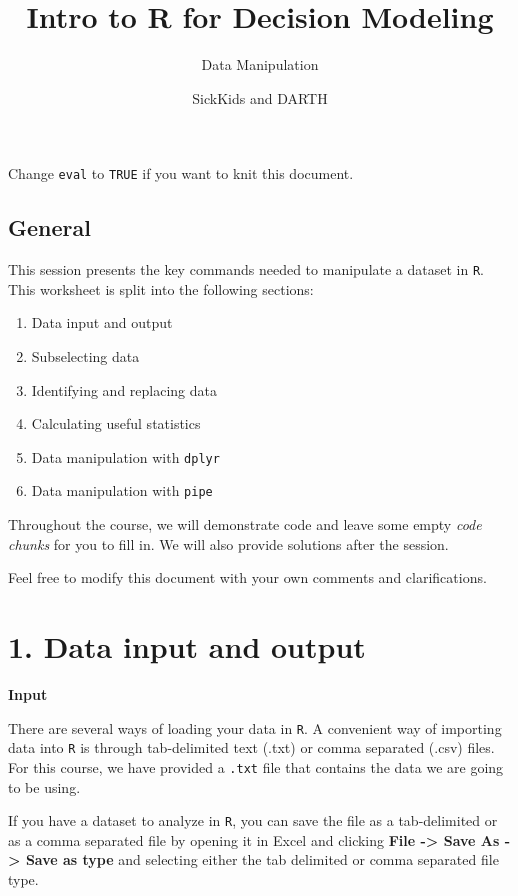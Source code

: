 \documentclass[
]{article}
\title{Intro to R for Decision Modeling}
\subtitle{Data Manipulation}
\author{SickKids and DARTH}
\date{}
\begin{document}
\maketitle

Change \texttt{eval} to \texttt{TRUE} if you want to knit this document.

\hypertarget{general}{%
\subsection{General}\label{general}}

This session presents the key commands needed to manipulate a dataset in
\texttt{R}. This worksheet is split into the following sections:

\begin{enumerate}
\def\labelenumi{\arabic{enumi}.}
\item
  Data input and output
\item
  Subselecting data
\item
  Identifying and replacing data
\item
  Calculating useful statistics
\item
  Data manipulation with \texttt{dplyr}
\item
  Data manipulation with \texttt{pipe}
\end{enumerate}

Throughout the course, we will demonstrate code and leave some empty
\emph{code chunks} for you to fill in. We will also provide solutions
after the session.

Feel free to modify this document with your own comments and
clarifications.

\hypertarget{data-input-and-output}{%
\section{1. Data input and output}\label{data-input-and-output}}

\textbf{Input}

There are several ways of loading your data in \texttt{R}. A convenient
way of importing data into \texttt{R} is through tab-delimited text
(.txt) or comma separated (.csv) files. For this course, we have
provided a \texttt{.txt} file that contains the data we are going to be
using.

If you have a dataset to analyze in \texttt{R}, you can save the file as
a tab-delimited or as a comma separated file by opening it in Excel and
clicking \textbf{File -\textgreater{} Save As -\textgreater{} Save as
type} and selecting either the tab delimited or comma separated file
type.
\end{document}
